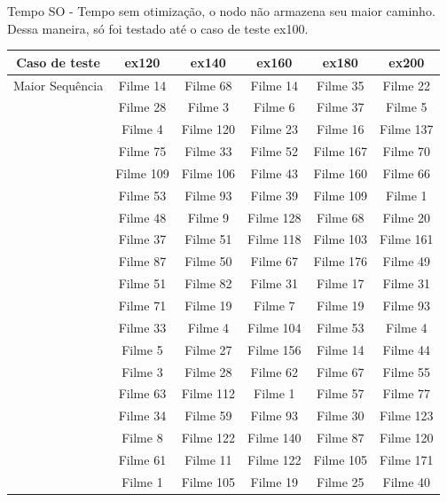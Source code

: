 \documentclass[12pt]{article}
\begin{document}
Tempo SO - Tempo sem otimização, o nodo não armazena seu maior caminho. Dessa
maneira, só foi testado até o caso de teste ex100.

\begin{table}[H]

\centering

\begin{tabular}{|c|c|c|c|c|c|}

\hline
Caso de teste & ex120 & ex140 & ex160 & ex180 & ex200 \\
\hline
Maior Sequência & Filme 14 & Filme 68 & Filme 14 & Filme 35 & Filme 22 \\
\cline{2-6}
& Filme 28 & Filme 3 & Filme 6 &  Filme 37 & Filme 5 \\
\cline{2-6}
& Filme 4 & Filme 120 & Filme 23 & Filme 16 & Filme 137 \\
\cline{2-6}
& Filme 75 & Filme 33 & Filme 52 & Filme 167 & Filme 70 \\
\cline{2-6}
& Filme 109 & Filme 106 & Filme 43 & Filme 160 & Filme 66 \\
\cline{2-6}
& Filme 53 & Filme 93 & Filme 39 & Filme 109 & Filme 1 \\
\cline{2-6}
& Filme 48 & Filme 9 & Filme 128 & Filme 68 & Filme 20 \\
\cline{2-6}
& Filme 37 & Filme 51 & Filme 118 & Filme 103 & Filme 161 \\
\cline{2-6}
& Filme 87 & Filme 50 & Filme 67 & Filme 176 & Filme 49 \\
\cline{2-6}
& Filme 51 & Filme 82 & Filme 31 & Filme 17 & Filme 31 \\
\cline{2-6}
& Filme 71 & Filme 19 & Filme 7 & Filme 19 & Filme 93 \\
\cline{2-6}
& Filme 33 & Filme 4 & Filme 104 & Filme 53 & Filme 4 \\
\cline{2-6}
& Filme 5 & Filme 27 & Filme 156 & Filme 14 & Filme 44 \\
\cline{2-6}
& Filme 3 & Filme 28 & Filme 62 & Filme 67 & Filme 55 \\
\cline{2-6}
& Filme 63 & Filme 112 & Filme 1 & Filme 57 & Filme 77 \\
\cline{2-6}
& Filme 34 & Filme 59 & Filme 93 & Filme 30 & Filme 123 \\
\cline{2-6}
& Filme 8 & Filme 122 & Filme 140 & Filme 87 & Filme 120 \\
\cline{2-6}
& Filme 61 & Filme 11 & Filme 122 & Filme 105 & Filme 171 \\
\cline{2-6}
& Filme 1 & Filme 105 & Filme 19 & Filme 25 & Filme 40 \\

\end{tabular}
\end{table}
\end{document}
